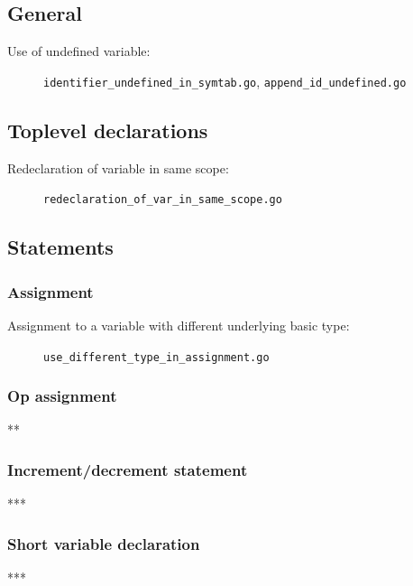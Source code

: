 \documentclass[oneside]{article}
\begin{document}
\subsection{General}

\begin{description}
  \item[Use of undefined variable:] \verb|identifier_undefined_in_symtab.go|, \verb|append_id_undefined.go|
\end{description}

\subsection{Toplevel declarations}

\begin{description}
  \item[Redeclaration of variable in same scope:] \verb|redeclaration_of_var_in_same_scope.go|
\end{description}

\subsection{Statements}

\subsubsection{Assignment}
\begin{description}
  \item[Assignment to a variable with different underlying basic type:] \verb|use_different_type_in_assignment.go|
\end{description}

\subsubsection{Op assignment}
\begin{description}
  \item ***
\end{description}

\subsubsection{Increment/decrement statement}
***

\subsubsection{Short variable declaration}
***
\end{document}
